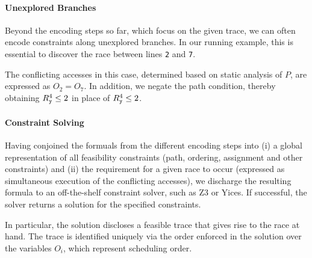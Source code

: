 \paragraph{Unexplored Branches} Beyond the encoding steps so far, which focus on the given trace, we can often encode constraints along unexplored branches. In our running example, this is essential to discover the race between lines {\tt 2} and {\tt 7}. 

The conflicting accesses in this case, determined based on static analysis of $P$, are expressed as $O_2=O_7$. In addition, we negate the path condition, thereby obtaining $R_{\tt y}^4 \leq 2$ in place of $R_{\tt y}^4 \leq 2$. 

\paragraph{Constraint Solving} Having conjoined the formuals from the different encoding steps into (i) a global representation of all feasibility constraints (path, ordering, assignment and other constraints) and (ii) the requirement for a given race to occur (expressed as simultaneous execution of the conflicting accesses), we discharge the resulting formula to an off-the-shelf constraint solver, such as Z3 or Yices. If successful, the solver returns a solution for the specified constraints. 

In particular, the solution discloses a feasible trace that gives rise to the race at hand. The trace is identified uniquely via the order enforced in the solution over the variables $O_i$, which represent scheduling order. 